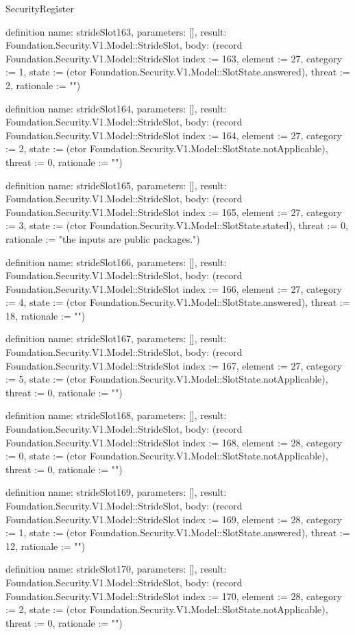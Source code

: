 \begin{lexlean}{SecurityRegister}
\begin{semanticmodule}
definition{
  name: strideSlot163,
  parameters: [],
  result: Foundation.Security.V1.Model::StrideSlot,
  body: (record Foundation.Security.V1.Model::StrideSlot {index := 163, element := 27, category := 1, state := (ctor Foundation.Security.V1.Model::SlotState.answered), threat := 2, rationale := ""})
}

definition{
  name: strideSlot164,
  parameters: [],
  result: Foundation.Security.V1.Model::StrideSlot,
  body: (record Foundation.Security.V1.Model::StrideSlot {index := 164, element := 27, category := 2, state := (ctor Foundation.Security.V1.Model::SlotState.notApplicable), threat := 0, rationale := ""})
}

definition{
  name: strideSlot165,
  parameters: [],
  result: Foundation.Security.V1.Model::StrideSlot,
  body: (record Foundation.Security.V1.Model::StrideSlot {index := 165, element := 27, category := 3, state := (ctor Foundation.Security.V1.Model::SlotState.stated), threat := 0, rationale := "the inputs are public packages."})
}

definition{
  name: strideSlot166,
  parameters: [],
  result: Foundation.Security.V1.Model::StrideSlot,
  body: (record Foundation.Security.V1.Model::StrideSlot {index := 166, element := 27, category := 4, state := (ctor Foundation.Security.V1.Model::SlotState.answered), threat := 18, rationale := ""})
}

definition{
  name: strideSlot167,
  parameters: [],
  result: Foundation.Security.V1.Model::StrideSlot,
  body: (record Foundation.Security.V1.Model::StrideSlot {index := 167, element := 27, category := 5, state := (ctor Foundation.Security.V1.Model::SlotState.notApplicable), threat := 0, rationale := ""})
}

definition{
  name: strideSlot168,
  parameters: [],
  result: Foundation.Security.V1.Model::StrideSlot,
  body: (record Foundation.Security.V1.Model::StrideSlot {index := 168, element := 28, category := 0, state := (ctor Foundation.Security.V1.Model::SlotState.notApplicable), threat := 0, rationale := ""})
}

definition{
  name: strideSlot169,
  parameters: [],
  result: Foundation.Security.V1.Model::StrideSlot,
  body: (record Foundation.Security.V1.Model::StrideSlot {index := 169, element := 28, category := 1, state := (ctor Foundation.Security.V1.Model::SlotState.answered), threat := 12, rationale := ""})
}

definition{
  name: strideSlot170,
  parameters: [],
  result: Foundation.Security.V1.Model::StrideSlot,
  body: (record Foundation.Security.V1.Model::StrideSlot {index := 170, element := 28, category := 2, state := (ctor Foundation.Security.V1.Model::SlotState.notApplicable), threat := 0, rationale := ""})
}


\end{semanticmodule}
\end{lexlean}
